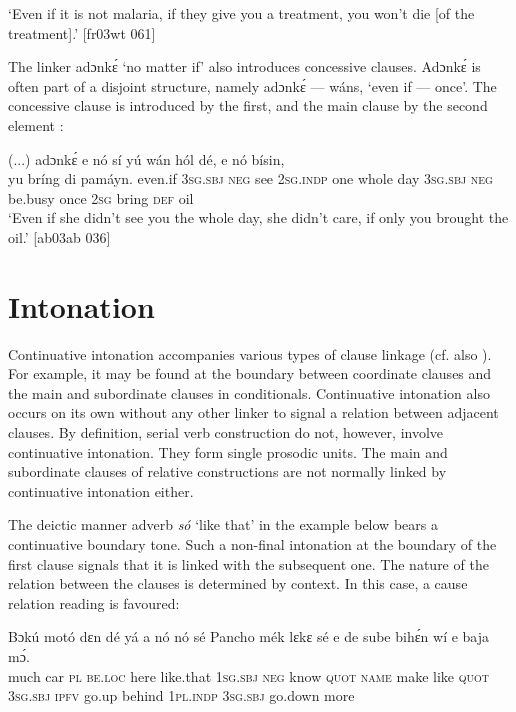 \glt ‘Even if it is not malaria, if they give you a treatment, you won’t die [of the treatment].’ [fr03wt 061]
\z

The linker adɔnkɛ́ ‘no matter if’ also introduces concessive clauses. Adɔnkɛ́ is often part of a disjoint structure, namely adɔnkɛ́ — wáns, ‘even if — once’. The concessive clause is introduced by the first, and the main clause by the second element : 


\ea%
    \label{ex:key:1537}
    \gll (...)  adɔnkɛ́  e    nó  sí  yú    wán  hól    dé,  e    nó  bísin,\\
  yu  bríng  di  pamáyn.
even.if  \textsc{3sg.sbj}  \textsc{neg}  see  \textsc{2sg.indp}  one  whole  day  \textsc{3sg.sbj}  \textsc{neg}  be.busy
once  \textsc{2sg}  bring  \textsc{def}  oil\\

\glt ‘Even if she didn’t see you the whole day, she didn’t care, if only you 
brought the oil.’ [ab03ab 036]
\z

\section{Intonation}\label{sec:10.8}

Continuative intonation accompanies various types of clause linkage (cf. also ). For example, it may be found at the boundary between coordinate clauses and the main and subordinate clauses in conditionals. Continuative intonation also occurs on its own without any other linker to signal a relation between adjacent clauses. By definition, serial verb construction do not, however, involve continuative intonation. They form single prosodic units. The main and subordinate clauses of relative constructions are not normally linked by continuative intonation either.


The deictic manner adverb \textit{só} ‘like that’ in the example below bears a continuative boundary tone. Such a non-final intonation at the boundary of the first clause signals that it is linked with the subsequent one. The nature of the relation between the clauses is determined by context. In this case, a cause relation reading is favoured:



\ea%
    \label{ex:key:1538}
    \gll Bɔkú  motó  dɛn  dé    yá        a    nó  nó    sé
Pancho  mék    lɛkɛ    sé    e    de  sube    bihɛ́n
wí    e    baja      mɔ́.\\
much  car    \textsc{pl}  \textsc{be.loc}  here    like.that  \textsc{1sg.sbj}  \textsc{neg}  know  \textsc{quot}
\textsc{name}  make  like    \textsc{quot}    \textsc{3sg.sbj}  \textsc{ipfv}  go.up  behind
\textsc{1pl.indp}  \textsc{3sg.sbj}  go.down    more\\

